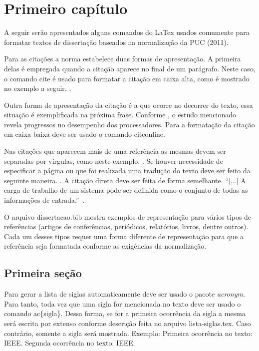 \chapter{Primeiro capítulo}
\label{cap1}

\vspace{-1.9cm}


  A seguir serão apresentados alguns comandos do LaTex usados comumente para formatar textos de dissertação baseados
  na normalização da PUC (2011).

  Para as citações a norma estabelece duas formas de apresentação. A primeira delas é empregada quando a
  citação aparece no final de um parágrafo. Neste caso, o comando cite é usado para formatar a citação em caixa alta,
  como é mostrado no exemplo a seguir. \cite{Duato:2002}.

  Outra forma de apresentação da citação é a que ocorre no decorrer do texto, essa situação é exemplificada na próxima frase.
  Conforme , o estudo mencionado revela progressos no desempenho dos processadores. 
  Para a formatação da citação em caixa baixa deve ser usado o comando citeonline.

  Nas citações que aparecem mais de uma referência as mesmas devem ser separadas por vírgulas, como
  neste exemplo. \cite{Keyes:2008, Zhao:2008, Ganguly:2011}. Se houver necessidade de especificar a página ou que foi
  realizada uma tradução do texto deve ser feito da seguinte maneira. \cite[p.~2, tradução nossa]{Sasaki:2009}.
  A citação direta deve ser feita de forma semelhante. ``[...] A carga de trabalho de um sistema pode 
  ser definida como o conjunto de todas as informações de entrada.''~\cite[p. 160]{Menasce:2002}.

  O arquivo dissertacao.bib mostra exemplos de representação para vários tipos de referências (artigos de conferências, 
  periódicos, relatórios, livros, dentre outros). Cada um desses tipos requer uma forma diferente de representação para 
  que a referência seja formatada conforme as exigências da normalização.

\section{Primeira seção}
\label{secao1}

  Para gerar a lista de siglas automaticamente deve ser usado o pacote \textit{acronym}. Para tanto, toda vez que uma sigla for mencionada no texto
  deve ser usado o comando ac\{sigla\}. Dessa forma, se for a primeira ocorrência da sigla a mesma será escrita por extenso
  conforme descrição feita no arquivo lista-siglas.tex. Caso contrário, somente a sigla será mostrada. Exemplo: Primeira
  ocorrência no texto: \ac{IEEE}. Segunda ocorrência no texto: \ac{IEEE}.

